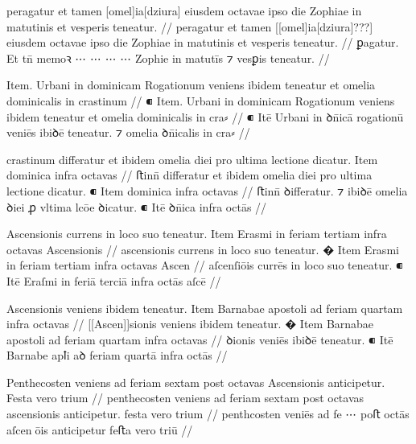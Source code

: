 \ex \bg
\gla
{}
peragatur
et tamen [omel]ia[dziura] eiusdem octavae ipso die Zophiae in matutinis et
vesperis teneatur.
//
\glRekonstrukcja
{}
peragatur
et tamen [[omel]ia[dziura]???] eiusdem octavae ipso die Zophiae in matutinis et
vesperis teneatur.
//
\glU
{}
ꝑagatur. Et tn̄ memoꝛ ⋯ ⋯ ⋯ ⋯ Zophie in matutīs ⁊ vesꝑis teneatur.
//
\endgl
\xe


\ex \bg
\gla
{}
{} Item. Urbani in dominicam Rogationum veniens ibidem teneatur
et omelia dominicalis in crastinum
//
\glRekonstrukcja
{}
⁌ Item. Urbani in dominicam Rogationum veniens ibidem teneatur
et omelia dominicalis in cra⸗
//
\glU
{}
⁌ Itē Urbani in ꝺn̄icā rogationū veniēs ibiꝺē teneatur. ⁊ omelia ꝺn̄icalis in cra⸗
//
\endgl
\xe



\ex \bg
\gla
{}
crastinum differatur et ibidem omelia diei pro
ultima lectione dicatur.
{} Item dominica infra octavas
//
\glRekonstrukcja
{}
ﬅinn̄ differatur et ibidem omelia diei pro
ultima lectione dicatur.
⁌ Item dominica infra octavas
//
\glU
{}
ﬅinn̄ ꝺiﬀeratur. ⁊ ibiꝺē omelia ꝺiei ꝓ vltima lcōe ꝺicatur. ⁌ Itē ꝺn̄ica infra octās
//
\endgl
\xe



\ex \bg
\gla
{}
Ascensionis currens in loco suo teneatur.
{} Item Erasmi in feriam tertiam infra octavas Ascensionis
//
\glRekonstrukcja
{}
ascensionis currens in loco suo teneatur.
� Item Erasmi in feriam tertiam infra octavas Ascen
//
\glU
{}
{}
aſcenſiōis currēs in loco suo teneatur. ⁌ Itē Eraſmi in feriā terciā infra octās aſcē
//
\endgl
\xe



\ex \bg
\gla
{}
Ascensionis veniens
ibidem teneatur. 
{} Item Barnabae apostoli ad feriam quartam infra octavas
//
\glRekonstrukcja
{}
[[Ascen]]sionis veniens
ibidem teneatur. � Item Barnabae apostoli ad feriam quartam infra octavas
//
\glU
{}
{}
ꝺionis veniēs ibiꝺē teneatur. ⁌ Itē Barnabe apꝉi aꝺ feriam quartā infra octās
//
\endgl
\xe



\ex \bg
\gla
{}
Penthecosten veniens ad feriam sextam post octavas Ascensionis anticipetur.
Festa vero trium
//
\glRekonstrukcja
{}
penthecosten veniens ad feriam sextam post octavas ascensionis anticipetur.
festa vero trium
//
\glU
{}
penthcosten veniēs ad fe ⋯  poﬅ octās aſcenōis anticipetur feﬅa vero triū
//
\endgl
\xe




